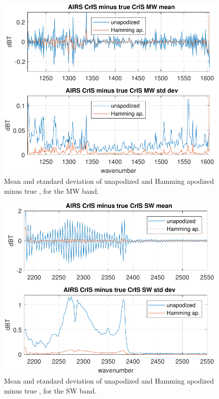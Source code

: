 \documentclass[journal]{IEEEtran}
\begin{document}
\begin{figure} %
  \centering
  \includegraphics[width=\linewidth]{figures/a2cris_diff_MW.pdf}
  \caption{Mean and standard deviation of unapodized and Hamming
    apodized {\airs} {\cris} minus true {\cris}, for the {\cris} MW
    band.}
  \label{diffMW}
\end{figure}

\begin{figure} %
  \centering
  \includegraphics[width=\linewidth]{figures/a2cris_diff_SW.pdf}
  \caption{Mean and standard deviation of unapodized and Hamming
    apodized {\airs} {\cris} minus true {\cris}, for the {\cris} SW
    band.}
  \label{diffSW}
\end{figure}
\end{document}
